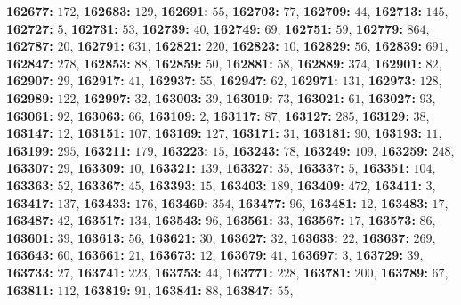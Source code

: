 \textsf{\bfseries 162677:} $172$, \textsf{\bfseries 162683:} $129$, \textsf{\bfseries 162691:} $55$, \textsf{\bfseries 162703:} $77$, \textsf{\bfseries 162709:} $44$, \textsf{\bfseries 162713:} $145$, \textsf{\bfseries 162727:} $5$, \textsf{\bfseries 162731:} $53$, \textsf{\bfseries 162739:} $40$, \textsf{\bfseries 162749:} $69$, \textsf{\bfseries 162751:} $59$, \textsf{\bfseries 162779:} $864$, \textsf{\bfseries 162787:} $20$, \textsf{\bfseries 162791:} $631$, \textsf{\bfseries 162821:} $220$, \textsf{\bfseries 162823:} $10$, \textsf{\bfseries 162829:} $56$, \textsf{\bfseries 162839:} $691$, \textsf{\bfseries 162847:} $278$, \textsf{\bfseries 162853:} $88$, \textsf{\bfseries 162859:} $50$, \textsf{\bfseries 162881:} $58$, \textsf{\bfseries 162889:} $374$, \textsf{\bfseries 162901:} $82$, \textsf{\bfseries 162907:} $29$, \textsf{\bfseries 162917:} $41$, \textsf{\bfseries 162937:} $55$, \textsf{\bfseries 162947:} $62$, \textsf{\bfseries 162971:} $131$, \textsf{\bfseries 162973:} $128$, \textsf{\bfseries 162989:} $122$, \textsf{\bfseries 162997:} $32$, \textsf{\bfseries 163003:} $39$, \textsf{\bfseries 163019:} $73$, \textsf{\bfseries 163021:} $61$, \textsf{\bfseries 163027:} $93$, \textsf{\bfseries 163061:} $92$, \textsf{\bfseries 163063:} $66$, \textsf{\bfseries 163109:} $2$, \textsf{\bfseries 163117:} $87$, \textsf{\bfseries 163127:} $285$, \textsf{\bfseries 163129:} $38$, \textsf{\bfseries 163147:} $12$, \textsf{\bfseries 163151:} $107$, \textsf{\bfseries 163169:} $127$, \textsf{\bfseries 163171:} $31$, \textsf{\bfseries 163181:} $90$, \textsf{\bfseries 163193:} $11$, \textsf{\bfseries 163199:} $295$, \textsf{\bfseries 163211:} $179$, \textsf{\bfseries 163223:} $15$, \textsf{\bfseries 163243:} $78$, \textsf{\bfseries 163249:} $109$, \textsf{\bfseries 163259:} $248$, \textsf{\bfseries 163307:} $29$, \textsf{\bfseries 163309:} $10$, \textsf{\bfseries 163321:} $139$, \textsf{\bfseries 163327:} $35$, \textsf{\bfseries 163337:} $5$, \textsf{\bfseries 163351:} $104$, \textsf{\bfseries 163363:} $52$, \textsf{\bfseries 163367:} $45$, \textsf{\bfseries 163393:} $15$, \textsf{\bfseries 163403:} $189$, \textsf{\bfseries 163409:} $472$, \textsf{\bfseries 163411:} $3$, \textsf{\bfseries 163417:} $137$, \textsf{\bfseries 163433:} $176$, \textsf{\bfseries 163469:} $354$, \textsf{\bfseries 163477:} $96$, \textsf{\bfseries 163481:} $12$, \textsf{\bfseries 163483:} $17$, \textsf{\bfseries 163487:} $42$, \textsf{\bfseries 163517:} $134$, \textsf{\bfseries 163543:} $96$, \textsf{\bfseries 163561:} $33$, \textsf{\bfseries 163567:} $17$, \textsf{\bfseries 163573:} $86$, \textsf{\bfseries 163601:} $39$, \textsf{\bfseries 163613:} $56$, \textsf{\bfseries 163621:} $30$, \textsf{\bfseries 163627:} $32$, \textsf{\bfseries 163633:} $22$, \textsf{\bfseries 163637:} $269$, \textsf{\bfseries 163643:} $60$, \textsf{\bfseries 163661:} $21$, \textsf{\bfseries 163673:} $12$, \textsf{\bfseries 163679:} $41$, \textsf{\bfseries 163697:} $3$, \textsf{\bfseries 163729:} $39$, \textsf{\bfseries 163733:} $27$, \textsf{\bfseries 163741:} $223$, \textsf{\bfseries 163753:} $44$, \textsf{\bfseries 163771:} $228$, \textsf{\bfseries 163781:} $200$, \textsf{\bfseries 163789:} $67$, \textsf{\bfseries 163811:} $112$, \textsf{\bfseries 163819:} $91$, \textsf{\bfseries 163841:} $88$, \textsf{\bfseries 163847:} $55$, 
